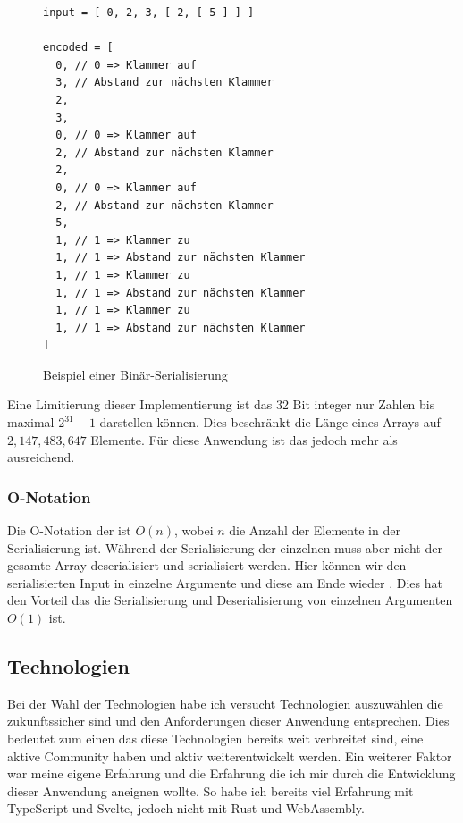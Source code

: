 \documentclass[ngerman]{article}
\begin{document}
\begin{figure}[htbp]
  \begin{code}
    \begin{verbatim}
input = [ 0, 2, 3, [ 2, [ 5 ] ] ]

encoded = [
  0, // 0 => Klammer auf
  3, // Abstand zur nächsten Klammer
  2,
  3,
  0, // 0 => Klammer auf
  2, // Abstand zur nächsten Klammer
  2, 
  0, // 0 => Klammer auf
  2, // Abstand zur nächsten Klammer
  5,
  1, // 1 => Klammer zu
  1, // 1 => Abstand zur nächsten Klammer 
  1, // 1 => Klammer zu
  1, // 1 => Abstand zur nächsten Klammer 
  1, // 1 => Klammer zu
  1, // 1 => Abstand zur nächsten Klammer 
]

    \end{verbatim}
  \end{code}

  \caption{Beispiel einer Binär-Serialisierung}
  \label{sec:data_nested_encoding}

\end{figure}

Eine Limitierung dieser Implementierung ist das 32 Bit integer nur Zahlen bis maximal $2^{31}-1$ darstellen können. Dies beschränkt die Länge eines Arrays auf $2,147,483,647$ Elemente. Für diese Anwendung ist das jedoch mehr als ausreichend.

\subsubsection*{O-Notation}
Die O-Notation der  ist $O(n)$, wobei $n$ die Anzahl der Elemente in der Serialisierung ist. Während der Serialisierung der einzelnen  muss aber nicht der gesamte Array deserialisiert und serialisiert werden. Hier können wir den serialisierten Input in einzelne Argumente  und diese am Ende wieder . Dies hat den Vorteil das die Serialisierung und Deserialisierung von einzelnen Argumenten $O(1)$ ist.

\subsection{Technologien}

Bei der Wahl der Technologien habe ich versucht Technologien auszuwählen die zukunftssicher sind und den Anforderungen dieser Anwendung entsprechen. Dies bedeutet zum einen das diese Technologien bereits weit verbreitet sind, eine aktive Community haben und aktiv weiterentwickelt werden.
\br
Ein weiterer Faktor war meine eigene Erfahrung und die Erfahrung die ich mir durch die Entwicklung dieser Anwendung aneignen wollte. So habe ich bereits viel Erfahrung mit TypeScript und Svelte, jedoch nicht mit Rust und WebAssembly.
\end{document}
